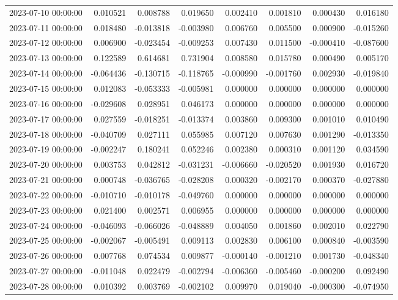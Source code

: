 \begin{tabular}{lrrrrrrr}
2023-07-10 00:00:00 & 0.010521 & 0.008788 & 0.019650 & 0.002410 & 0.001810 & 0.000430 & 0.016180 \\
2023-07-11 00:00:00 & 0.018480 & -0.013818 & -0.003980 & 0.006760 & 0.005500 & 0.000900 & -0.015260 \\
2023-07-12 00:00:00 & 0.006900 & -0.023454 & -0.009253 & 0.007430 & 0.011500 & -0.000410 & -0.087600 \\
2023-07-13 00:00:00 & 0.122589 & 0.614681 & 0.731904 & 0.008580 & 0.015780 & 0.000490 & 0.005170 \\
2023-07-14 00:00:00 & -0.064436 & -0.130715 & -0.118765 & -0.000990 & -0.001760 & 0.002930 & -0.019840 \\
2023-07-15 00:00:00 & 0.012083 & -0.053333 & -0.005981 & 0.000000 & 0.000000 & 0.000000 & 0.000000 \\
2023-07-16 00:00:00 & -0.029608 & 0.028951 & 0.046173 & 0.000000 & 0.000000 & 0.000000 & 0.000000 \\
2023-07-17 00:00:00 & 0.027559 & -0.018251 & -0.013374 & 0.003860 & 0.009300 & 0.001010 & 0.010490 \\
2023-07-18 00:00:00 & -0.040709 & 0.027111 & 0.055985 & 0.007120 & 0.007630 & 0.001290 & -0.013350 \\
2023-07-19 00:00:00 & -0.002247 & 0.180241 & 0.052246 & 0.002380 & 0.000310 & 0.001120 & 0.034590 \\
2023-07-20 00:00:00 & 0.003753 & 0.042812 & -0.031231 & -0.006660 & -0.020520 & 0.001930 & 0.016720 \\
2023-07-21 00:00:00 & 0.000748 & -0.036765 & -0.028208 & 0.000320 & -0.002170 & 0.000370 & -0.027880 \\
2023-07-22 00:00:00 & -0.010710 & -0.010178 & -0.049760 & 0.000000 & 0.000000 & 0.000000 & 0.000000 \\
2023-07-23 00:00:00 & 0.021400 & 0.002571 & 0.006955 & 0.000000 & 0.000000 & 0.000000 & 0.000000 \\
2023-07-24 00:00:00 & -0.046093 & -0.066026 & -0.048889 & 0.004050 & 0.001860 & 0.002010 & 0.022790 \\
2023-07-25 00:00:00 & -0.002067 & -0.005491 & 0.009113 & 0.002830 & 0.006100 & 0.000840 & -0.003590 \\
2023-07-26 00:00:00 & 0.007768 & 0.074534 & 0.009877 & -0.000140 & -0.001210 & 0.001730 & -0.048340 \\
2023-07-27 00:00:00 & -0.011048 & 0.022479 & -0.002794 & -0.006360 & -0.005460 & -0.000200 & 0.092490 \\
2023-07-28 00:00:00 & 0.010392 & 0.003769 & -0.002102 & 0.009970 & 0.019040 & -0.000300 & -0.074950 \\

\end{tabular}
